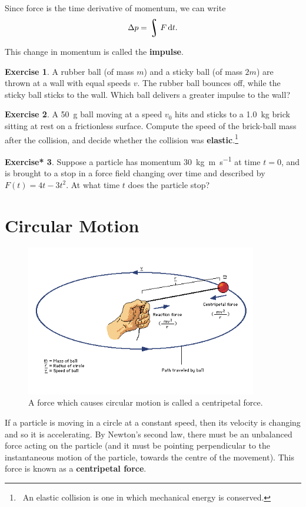\documentclass[a4paper]{amsbook}
\theoremstyle{definition}
\newtheorem{exercise}{Exercise}
\numberwithin{exercise}{chapter}
\newtheorem{exercise*}[exercise]{Exercise*}
\numberwithin{exercise}{chapter}
\DeclareMathOperator*{\rint}{\scalerel*{\rotatebox{17}{$\!\int\!$}}{\int}}
\newcommand\capcite[1]{}
\begin{document}
Since force is the time derivative of momentum, we can write
\begin{equation}
  \Delta p = \rint F \dif{t}.
\end{equation}

This change in momentum is called the \textbf{impulse}.

\begin{exercise}
  A rubber ball (of mass $ m $) and a sticky ball (of mass $ 2m $) are thrown at a wall with equal speeds $ v $. The
  rubber ball bounces off, while the sticky ball sticks to the wall. Which ball delivers a greater impulse to the wall?
\end{exercise}

\begin{exercise}
  A \SI{50}{\gram} ball moving at a speed $ v_0 $ hits and sticks to a \SI{1.0}{\kilo\gram} brick sitting at rest on
  a frictionless surface. Compute the speed of the brick-ball mass after the collision, and decide whether the collision
  was \textbf{elastic}.\footnote{~An elastic collision is one in which mechanical energy is conserved.}
\end{exercise}

\begin{exercise*}
  Suppose a particle has momentum \SI{30}{\kilo\gram \metre\per\second} at time $ t = 0 $, and is brought to a stop in
  a force field changing over time and described by $ F(t) = 4t - 3t^2 $. At what time $ t $ does the particle stop?
\end{exercise*}

\section{Circular Motion}
\begin{figure}
  \centering
  \includegraphics[width=0.9\textwidth]{centripetal}
  \caption{A force which causes circular motion is called a centripetal force. \capcite{https://i.pinimg.com/originals/74/d2/28/74d228e85a6a3f4fb700bcafa677539d.gif}\label{fig:centripetal}}
\end{figure}
If a particle is moving in a circle at a constant speed, then its velocity is changing and so it is accelerating. By
Newton's second law, there must be an unbalanced force acting on the particle (and it must be pointing perpendicular to
the instantaneous motion of the particle, towards the centre of the movement). This force is known as a \textbf{centripetal force}.
\end{document}

